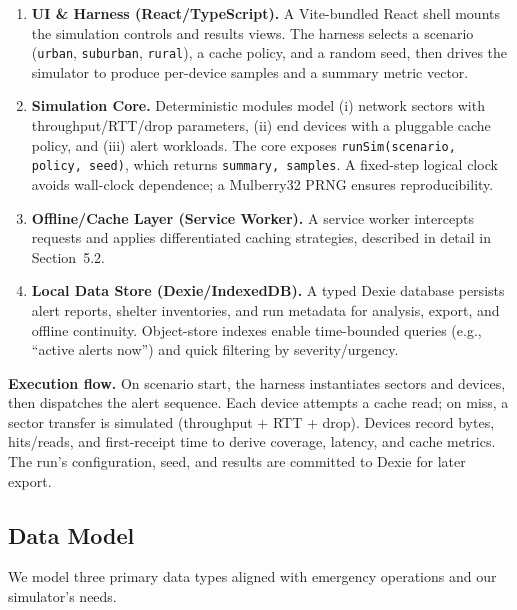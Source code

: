 \documentclass[11pt,twocolumn]{article}
\begin{document}
\begin{enumerate}
\item \textbf{UI \& Harness (React/TypeScript).} A Vite-bundled React shell mounts the simulation controls and results views. The harness selects a scenario (\texttt{urban}, \texttt{suburban}, \texttt{rural}), a cache policy, and a random seed, then drives the simulator to produce per-device samples and a summary metric vector.

\item \textbf{Simulation Core.} Deterministic modules model (i) network sectors with throughput/RTT/drop parameters, (ii) end devices with a pluggable cache policy, and (iii) alert workloads. The core exposes \texttt{runSim({scenario, policy, seed})}, which returns \texttt{{summary, samples}}. A fixed-step logical clock avoids wall-clock dependence; a Mulberry32 PRNG ensures reproducibility.

\item \textbf{Offline/Cache Layer (Service Worker).} A service worker intercepts requests and applies differentiated caching strategies, described in detail in Section~5.2.

\item \textbf{Local Data Store (Dexie/IndexedDB).} A typed Dexie database persists alert reports, shelter inventories, and run metadata for analysis, export, and offline continuity. Object-store indexes enable time-bounded queries (e.g., “active alerts now”) and quick filtering by severity/urgency.
\end{enumerate}

\noindent\textbf{Execution flow.} On scenario start, the harness instantiates sectors and devices, then dispatches the alert sequence. Each device attempts a cache read; on miss, a sector transfer is simulated (throughput + RTT + drop). Devices record bytes, hits/reads, and first-receipt time to derive coverage, latency, and cache metrics. The run’s configuration, seed, and results are committed to Dexie for later export.

\subsection{Data Model}
We model three primary data types aligned with emergency operations and our simulator’s needs.
\end{document}
